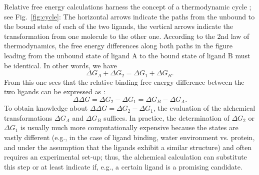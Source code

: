 Relative free energy calculations harness the concept of a thermodynamic
cycle \cite{Kollman.}; see Fig.~\ref{fig:cycle}: The horizontal arrows indicate the
paths from the unbound to the bound state of each of the two ligands,
the vertical arrows indicate the transformation from one molecule
to the other one. According to the 2nd law of thermodynamics, the free energy differences along both paths
in the figure leading from the unbound state of ligand A to the bound state
of ligand B must be identical. In other words, we have
\begin{equation}
\Delta G_{A}+\Delta G_{2}=\Delta G_{1}+\Delta G_{B}.
\end{equation}
From this one sees that the relative binding free energy difference between the two ligands can be expressed as \cite{Cournia.2017}:
\begin{equation}
\Delta\Delta G=\Delta G_{2}-\Delta G_{1}=\Delta G_{B}-\Delta G_{A}.
\end{equation}
To obtain knowledge about $\Delta\Delta G=\Delta G_{2}-\Delta G_{1}$,
the evaluation of the alchemical transformations $\Delta G_{A}$ and
$\Delta G_{B}$ suffices. In practice, the determination
of $\Delta G_{2}$ or $\Delta G_{1}$ is usually much more computationally expensive because the states are vastly different (e.g., in the case of ligand binding, water environment vs. protein, and under the assumption that the ligands exhibit a similar structure) and often requires an experimental
set-up; thus, the alchemical calculation can substitute this step
or at least indicate if, e.g., a certain ligand is a promising candidate.

